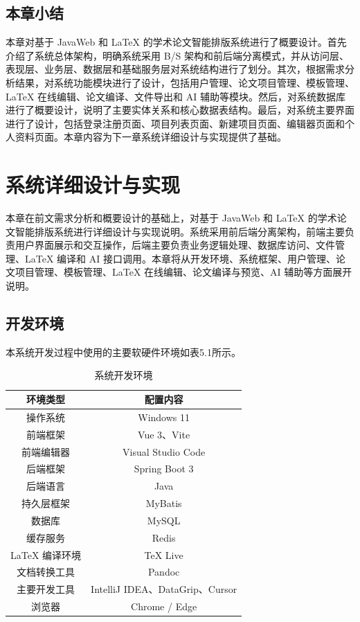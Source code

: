 \documentclass{xduugthesis}
\begin{document}
\section{本章小结}
本章对基于 JavaWeb 和 LaTeX 的学术论文智能排版系统进行了概要设计。首先介绍了系统总体架构，明确系统采用 B/S 架构和前后端分离模式，并从访问层、表现层、业务层、数据层和基础服务层对系统结构进行了划分。其次，根据需求分析结果，对系统功能模块进行了设计，包括用户管理、论文项目管理、模板管理、LaTeX 在线编辑、论文编译、文件导出和 AI 辅助等模块。然后，对系统数据库进行了概要设计，说明了主要实体关系和核心数据表结构。最后，对系统主要界面进行了设计，包括登录注册页面、项目列表页面、新建项目页面、编辑器页面和个人资料页面。本章内容为下一章系统详细设计与实现提供了基础。

\chapter{系统详细设计与实现}
本章在前文需求分析和概要设计的基础上，对基于 JavaWeb 和 LaTeX 的学术论文智能排版系统进行详细设计与实现说明。系统采用前后端分离架构，前端主要负责用户界面展示和交互操作，后端主要负责业务逻辑处理、数据库访问、文件管理、LaTeX 编译和 AI 接口调用。本章将从开发环境、系统框架、用户管理、论文项目管理、模板管理、LaTeX 在线编辑、论文编译与预览、AI 辅助等方面展开说明。

\section{开发环境}

本系统开发过程中使用的主要软硬件环境如表5.1所示。

\begin{table}[H]
    \centering
    \caption{系统开发环境}
    \label{tab:development-environment}
    \begin{tabular}{|c|c|}
        \hline
        \textbf{环境类型} & \textbf{配置内容} \\ \hline
        操作系统 & Windows 11 \\ \hline
        前端框架 & Vue 3、Vite \\ \hline
        前端编辑器 & Visual Studio Code \\ \hline
        后端框架 & Spring Boot 3 \\ \hline
        后端语言 & Java \\ \hline
        持久层框架 & MyBatis \\ \hline
        数据库 & MySQL \\ \hline
        缓存服务 & Redis \\ \hline
        \LaTeX{} 编译环境 & TeX Live \\ \hline
        文档转换工具 & Pandoc \\ \hline
        主要开发工具 & IntelliJ IDEA、DataGrip、Cursor \\ \hline
        浏览器 & Chrome / Edge \\ \hline
    \end{tabular}
\end{table}
\end{document}
